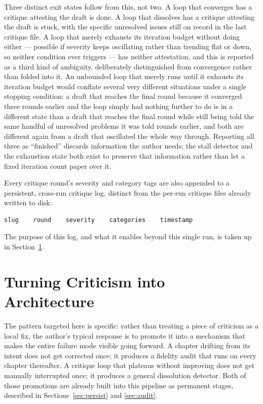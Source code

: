 \documentclass[11pt]{article}
\theoremstyle{definition}
\begin{document}
Three distinct exit states follow from this, not two. A loop that
converges has a critique attesting the draft is done. A loop that
dissolves has a critique attesting the draft is stuck, with the
specific unresolved issues still on record in the last critique file. A
loop that merely exhausts its iteration budget without doing either ---
possible if severity keeps oscillating rather than trending flat or
down, so neither condition ever triggers --- has neither attestation,
and this is reported as a third kind of ambiguity, deliberately
distinguished from convergence rather than folded into it. An
unbounded loop that merely runs until it exhausts its iteration budget
would conflate several very different situations under a single
stopping condition: a draft that reaches the final round because it
converged three rounds earlier and the loop simply had nothing further
to do is in a different state than a draft that reaches the final
round while still being told the same handful of unresolved problems it
was told rounds earlier, and both are different again from a draft that
oscillated the whole way through. Reporting all three as ``finished''
discards information the author needs; the stall detector and the
exhaustion state both exist to preserve that information rather than
let a fixed iteration count paper over it.

Every critique round's severity and category tags are also appended to
a persistent, cross-run critique log, distinct from the per-run
critique files already written to disk:

\begin{lstlisting}[caption={Critique log schema (tab-separated)}]
slug    round    severity    categories    timestamp
\end{lstlisting}

The purpose of this log, and what it enables beyond this single run, is
taken up in Section~\ref{sec:architecture}.

\section{Turning Criticism into Architecture}
\label{sec:architecture}

The pattern targeted here is specific: rather than treating a piece of
criticism as a local fix, the author's typical response is to promote
it into a mechanism that makes the entire failure mode visible going
forward. A chapter drifting from its intent does not get corrected
once; it produces a fidelity audit that runs on every chapter
thereafter. A critique loop that plateaus without improving does not
get manually interrupted once; it produces a general dissolution
detector. Both of those promotions are already built into this pipeline
as permanent stages, described in Sections~\ref{sec:persist} and
\ref{sec:audit}.
\end{document}
